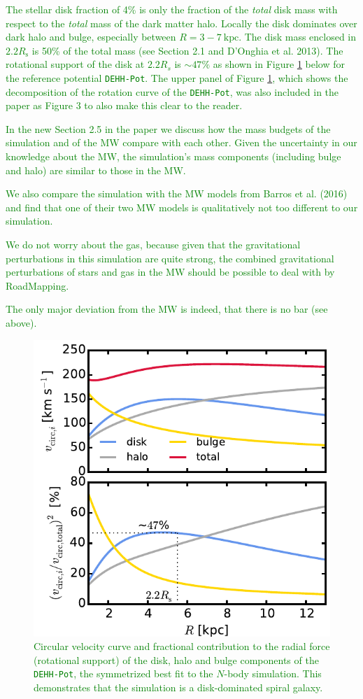 \documentclass[10pt,a4paper]{article}
\newcommand{\Answer}[1]{\textcolor{Green}{#1}}
\begin{document}
\Answer{The stellar disk fraction of 4\% is only the fraction of the \emph{total} disk mass with respect to the \emph{total} mass of the dark matter halo. Locally the disk dominates over dark halo and bulge, especially between $R=3-7~\text{kpc}$. The disk mass enclosed in $2.2R_\text{s}$ is 50\% of the total mass (see Section 2.1 and D'Onghia et al. 2013). The rotational support of the disk at $2.2R_s$ is $\sim47\%$ as shown in Figure \ref{fig:rot_support} below for the reference potential \texttt{DEHH-Pot}. The upper panel of Figure \ref{fig:rot_support}, which shows the decomposition of the rotation curve of the \texttt{DEHH-Pot}, was also included in the paper as Figure 3 to also make this clear to the reader.}

\Answer{In the new Section 2.5 in the paper we discuss how the mass budgets of the simulation and of the MW compare with each other. Given the uncertainty in our knowledge about the MW, the simulation's mass components (including bulge and halo) are similar to those in the MW.}

\Answer{We also compare the simulation with the MW models from Barros et al. (2016) and find that one of their two MW models is qualitatively not too different to our simulation.}

\Answer{We do not worry about the gas, because given that the gravitational perturbations in this simulation are quite strong, the combined gravitational perturbations of stars and gas in the MW should be possible to deal with by RoadMapping.}

\Answer{The only major deviation from the MW is indeed, that there is no bar (see above).}

\begin{figure}[!htbp]
\centering
\includegraphics[width=0.7\columnwidth]{fig/plot_vcirc_decomposed.pdf}
\caption{\Answer{Circular velocity curve and fractional contribution to the radial force (rotational support) of the disk, halo and bulge components of the \texttt{DEHH-Pot}, the symmetrized best fit to the $N$-body simulation. This demonstrates that the simulation is a disk-dominated spiral galaxy.}}
\label{fig:rot_support}
\end{figure}
\end{document}
